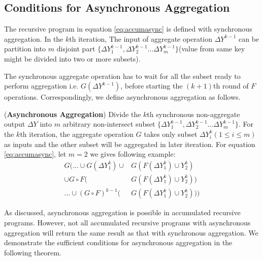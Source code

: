 {\subsection{Conditions for Asynchronous Aggregation}
\label{sec:async:condition}
The recursive program in equation \ref{eq:accumasync} is defined with synchronous aggregation. 
In the $k$th iteration, The input of aggregate operation  $\Delta Y^{k-1}$ can be partition into $m$ disjoint part $\{\Delta Y_1^{k-1},\Delta Y_2^{k-1}\ldots \Delta Y_m^{k-1} \}$(value from same key might be divided into two or more subsets).
 
The synchronous aggregate operation has to wait for all the subset ready to perform aggregation i.e. $G(\Delta Y^{k-1})$, before starting the $(k+1)$th round of $F$ operations.  Correspondingly, we define asynchronous aggregation as follows.
\begin{definition}(\textbf{Asynchronous Aggregation})
	\label{def:asyncaggre}
	Divide the $k$th synchronous non-aggregate output $\Delta Y$ into $m$ arbitrary non-intersect subset $\{\Delta Y_1^{k-1},\Delta Y_2^{k-1}\ldots \Delta Y_m^{k-1} \}$. For the $k$th iteration, the aggregate operation $G$ takes only subset $\Delta Y_{i}^k(1\le i\le m)$ as inputs and the other subset will be aggregated in later iteration.
     For equation \ref{eq:accumasync}, let $m=2$ we gives following example:
     \begin{equation}
     \begin{aligned}
	G\big(\ldots\cup G(\Delta Y^k_1)\cup &G(F(\Delta Y^k_1)\cup Y^k_2)\\
	 \cup G\circ F(&G(F(\Delta Y^k_1)\cup Y^k_2)) \\
	\ldots\cup (G\circ F)^{k-1}(&G(F(\Delta Y^k_1)\cup Y^k_2))\big)
	\end{aligned}
	\end{equation}
\end{definition}



As discussed, asynchronous aggregation is possible in accumulated recursive programs. However, not all accumulated recursive programs with asynchronous aggregation will return the same result as that with synchronous aggregation. We demonstrate the sufficient conditions for asynchronous aggregation in the following theorem.

}
